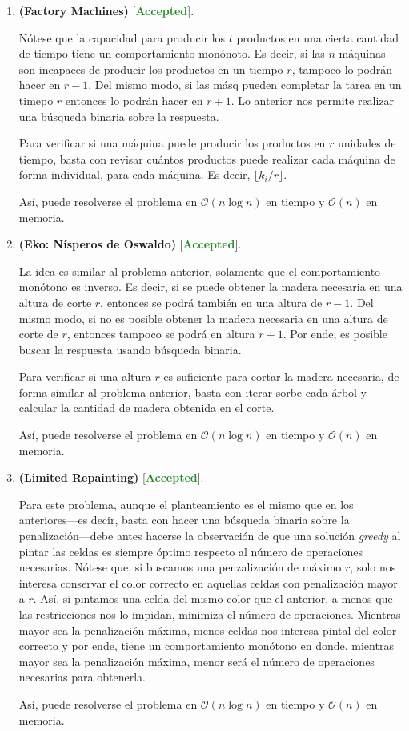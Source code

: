 \documentclass{article}
\begin{document}
    \begin{enumerate}[label=\textbf{Problema \arabic*}]
        \item \textbf{(Factory Machines)} [\textcolor{ForestGreen}{\textbf{Accepted}}].
        
        Nótese que la capacidad para producir los $t$ productos en una cierta cantidad de tiempo tiene un comportamiento monónoto. Es decir, si las $n$ máquinas son incapaces de producir los productos en un tiempo $r$, tampoco lo podrán hacer en $r - 1$. Del mismo modo, si las másq pueden completar la tarea en un timepo $r$ entonces lo podrán hacer en $r + 1$. Lo anterior nos permite realizar una búsqueda binaria sobre la respuesta.

        Para verificar si una máquina puede producir los productos en $r$ unidades de tiempo, basta con revisar cuántos productos puede realizar cada máquina de forma individual, para cada máquina. Es decir, $\lfloor k_i / r \rfloor$.

        Así, puede resolverse el problema en $\mathcal{O}(n\log n)$ en tiempo y $\mathcal{O}(n)$ en memoria.

        \item \textbf{(Eko: Nísperos de Oswaldo)} [\textcolor{ForestGreen}{\textbf{Accepted}}].
        
        La idea es similar al problema anterior, solamente que el comportamiento monótono es inverso. Es decir, si se puede obtener la madera necesaria en una altura de corte $r$, entonces se podrá también en una altura de $r - 1$. Del mismo modo, si no es posible obtener la madera necesaria en una altura de corte de $r$, entonces tampoco se podrá en altura $r + 1$. Por ende, es posible buscar la respuesta usando búsqueda binaria.

        Para verificar si una altura $r$ es suficiente para cortar la madera necesaria, de forma similar al problema anterior, basta con iterar sorbe cada árbol y calcular la cantidad de madera obtenida en el corte.

        Así, puede resolverse el problema en $\mathcal{O}(n\log n)$ en tiempo y $\mathcal{O}(n)$ en memoria.

        \item \textbf{(Limited Repainting)} [\textcolor{ForestGreen}{\textbf{Accepted}}].
        
        Para este problema, aunque el planteamiento es el mismo que en los anteriores—es decir, basta con hacer una búsqueda binaria sobre la penalización—debe antes hacerse la observación de que una solución \textit{greedy} al pintar las celdas es siempre óptimo respecto al número de operaciones necesarias. Nótese que, si buscamos una penzalización de máximo $r$, solo nos interesa conservar el color correcto en aquellas celdas con penalización mayor a $r$. Así, si pintamos una celda del mismo color que el anterior, a menos que las restricciones nos lo impidan, minimiza el número de operaciones. Mientras mayor sea la penalización máxima, menos celdas nos interesa pintal del color correcto y por ende, tiene un comportamiento monótono en donde, mientras mayor sea la penalización máxima, menor será el número de operaciones necesarias para obtenerla.

        Así, puede resolverse el problema en $\mathcal{O}(n\log n)$ en tiempo y $\mathcal{O}(n)$ en memoria.
    \end{enumerate}
\end{document}
